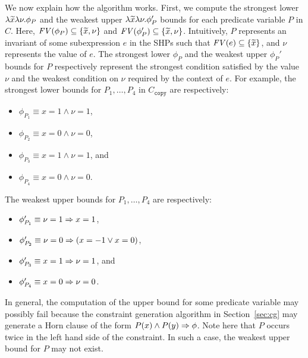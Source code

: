 We now explain how the algorithm works.  First, we compute the strongest
lower \(\lambda \widetilde{x}\lambda \nu.\phi_P\) and the weakest upper
\(\lambda \widetilde{x}\lambda \nu.\phi_P'\) bounds for each predicate
variable \(P\) in \(C\).  Here, \(\mathit{FV}({\phi_P}) \subseteq
\{{\widetilde{x},\nu}\}\) and \(\mathit{FV}({\phi_P'}) \subseteq \{{\widetilde{x},\nu}\}\).
Intuitively, \(P\) represents an invariant of some subexpression \(e\)
in the SHPs such that \(\mathit{FV}({e}) \subseteq \{{\widetilde{x}}\}\), and \(\nu\)
represents the value of \(e\).  The strongest lower \(\phi_P\) and the
weakest upper \(\phi_{P}'\) bounds for \(P\) respectively represent the
strongest condition satisfied by the value \(\nu\) and the weakest
condition on \(\nu\) required by the context of \(e\).  For example, the
strongest lower bounds for \(P_1,\dots,P_4\) in \(C_{\texttt{copy}}\)
are respectively:
\begin{itemize}
\item \(\phi_{P_1}\equiv x=1 \land \nu=1\),
\item \(\phi_{P_2}\equiv x=0 \land \nu=0\),
\item \(\phi_{P_3}\equiv x=1 \land \nu=1\), and
\item \(\phi_{P_4}\equiv x=0 \land \nu=0\).
\end{itemize}
The weakest upper bounds for \(P_1,\dots,P_4\) are respectively:
\begin{itemize}
\item \(\phi_{P_1}'\equiv \nu=1 \Rightarrow x=1\),
\item \(\phi_{P_2}'\equiv \nu=0 \Rightarrow (x=-1 \lor x=0)\),
\item \(\phi_{P_3}'\equiv x=1 \Rightarrow \nu=1\), and
\item \(\phi_{P_4}'\equiv x=0 \Rightarrow \nu=0\).
\end{itemize}

In general, the computation of the upper bound for some predicate
variable may possibly fail because the constraint generation algorithm
in Section~\ref{sec:cg} may generate a Horn clause of the form \(P(x)
\land P(y) \Rightarrow \phi\).  Note here that \(P\) occurs twice in the left
hand side of the constraint.  In such a case, the weakest upper bound
for \(P\) may not exist.

